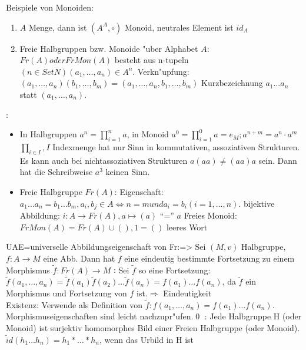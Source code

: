 \example Beispiele von Monoiden:{
  \begin{enumerate}
    \item $A$ Menge, dann ist $(A^A,\circ)$ Monoid, neutrales Element ist $id_A$
	\item Freie Halbgruppen bzw. Monoide "uber Alphabet $A$:
	  $Fr(A) oder FrMon(A)$ besteht aus n-tupeln $(n\in SetN) (a_1,\ldots,a_n)\in A^n$.
	  Verkn"upfung: $(a_1,\ldots,a_n)(b_1,\ldots,b_m)=(a_1,\ldots,a_n,b_1,\ldots,b_m)$
	  Kurzbezeichnung $a_1\ldots a_n$ statt $(a_1,\ldots,a_n)$.
  \end{enumerate}}
\remark:{
  \begin{itemize}
    \item In Halbgruppen $a^n=\prod _{i=1}^n a$,
  	  in Monoid $a^0=\prod_{i=1}^0 a=e_M; a^{n+m}=a^n\cdot a^m$
  	  $\prod_{i\in I}, I$ Indexmenge hat nur Sinn in kommutativen, assoziativen Strukturen.
  	  Es kann auch bei nichtassoziativen Strukturen $a(aa)\not= (aa)a$ sein. Dann hat die Schreibweise $a^3$ keinen Sinn.
	\item Freie Halbgruppe $Fr(A)$: Eigenschaft:$a_1\ldots a_n=b_1\ldots b_m, a_i,b_j\in A \Longleftrightarrow n=m und a_i=b_i
	  (i=1,\ldots ,n)$.
	  bijektive Abbildung: $i: A \to Fr(A), a\mapsto (a)$ ``='' $a$
	  Freies Monoid: $FrMon(A)=Fr(A)\cup (  ), 1=(  )$ leeres Wort
  \end{itemize}}
\theorem UAE=universelle Abbildungseigenschaft von Fr:=>{
  Sei $(M,v)$ Halbgruppe, $f:A\to M$ eine Abb. Dann hat $f$ eine eindeutig bestimmte Fortsetzung zu einem
  Morphismus $\tilde f:Fr(A)\to M$ 
  }
\proof:{
  Sei $\tilde f$ so eine Fortsetzung: $\tilde f(a_1,\ldots,a_n)=\tilde f(a_1)\tilde f(a_2)\ldots\tilde f(a_n)=f(a_1)\ldots f(a_n)$,
  da $\tilde f$ ein Morphismus und Fortsetzung von $f$ ist.$\Rightarrow$ Eindeutigkeit \\
  Existenz: Verwende als Definition von $\tilde f: f(a_1,\ldots,a_n)=f(a_1)\ldots f(a_n)$. Morphismuseigenschaften
  sind leicht nachzupr"ufen.\qed}
\remark:{
  Jede Halbgruppe H (oder Monoid) ist surjektiv homomorphes Bild einer Freien Halbgruppe (oder Monoid).
  $\tilde id(h_1\ldots h_n)=h_1\ast\ldots\ast h_n$, wenn das Urbild in H ist}
